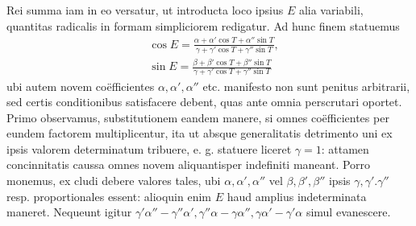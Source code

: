 Rei summa iam in eo versatur, ut introducta loco ipsius $E$ alia variabili,
quantitas radicalis in formam simpliciorem redigatur. Ad hunc finem statuemus
\[
\begin{aligned}
&\cos E=\frac{\alpha+\alpha'\cos T+\alpha''\sin T}{\gamma+\gamma'\cos T+\gamma''\sin T},\\[6pt]
&
\sin E=\frac{\beta+\beta'\cos T+\beta''\sin T}{\gamma+\gamma'\cos T+\gamma''\sin T}
\end{aligned}
\]
ubi autem novem coëfficientes $\alpha,\alpha',\alpha''$ etc. manifesto non sunt penitus arbitrarii,
sed certis conditionibus satisfacere debent, quas ante omnia perscrutari oportet.
Primo observamus, substitutionem eandem manere, si omnes coëfficientes per
eundem factorem multiplicentur, ita ut absque generalitatis detrimento uni ex ipsis
valorem determinatum tribuere, e. g. statuere liceret $\gamma=1$: attamen concinnitatis caussa omnes novem aliquantisper indefiniti maneant. Porro monemus, ex%
cludi debere valores tales, ubi $\alpha,\alpha',\alpha''$ vel $\beta,\beta',\beta''$ ipsis $\gamma,\gamma'.\gamma''$ resp. proportionales essent: alioquin enim $E$ haud amplius indeterminata maneret. Nequeunt igitur $\gamma'\alpha''-\gamma''\alpha',\gamma''\alpha-\gamma\alpha'',\gamma\alpha'-\gamma'\alpha$ simul evanescere.

